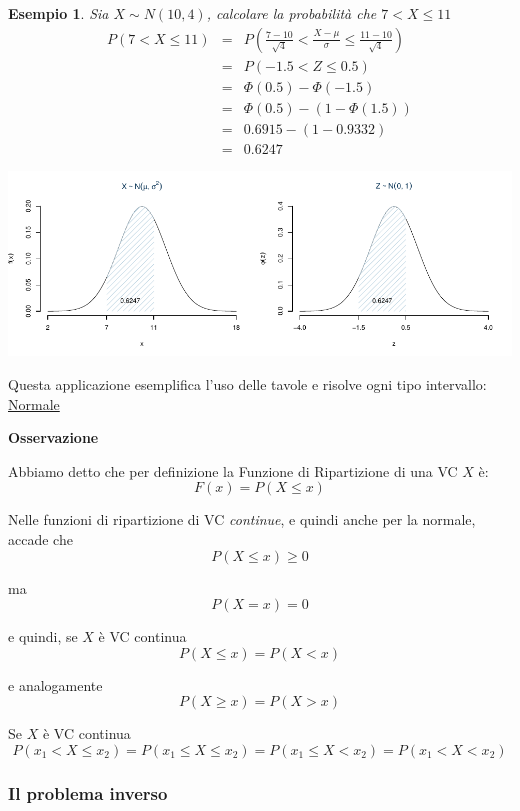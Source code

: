 \documentclass[
  11pt,
]{book}
\theoremstyle{mytheoremstyle}
\theoremstyle{mydefstyle}
\newtheorem{example}{{Esempio}}[section]
\begin{document}
\begin{example}

Sia \(X\sim N(10,4)\), calcolare la probabilità che \(7<X\leq 11\)
\begin{eqnarray*}
P(7<X\leq 11) &=& P\left( \frac {7 - 10}{\sqrt{4}} < \frac {X - \mu}\sigma \leq \frac {11 - 10}{\sqrt{4}}\right)  \\
              &=& P\left( -1.5 < Z \leq 0.5\right) \\
              &=& \Phi(0.5)-\Phi(-1.5)\\
              &=& \Phi(0.5)-(1-\Phi(1.5))\\
              &=& 0.6915-(1-0.9332)\\
              &=& 0.6247
\end{eqnarray*}

\begin{center}\includegraphics{Appunti_di_Statistica_2025_files/figure-latex/07c-Normale-26-1} \end{center}

\end{example}

Questa applicazione esemplifica l'uso delle tavole e risolve ogni tipo intervallo: \href{https://patrizio-frederic.shinyapps.io/normale/}{Normale}

\textbf{Osservazione}

Abbiamo detto che per definizione la Funzione di Ripartizione di una VC \(X\) è:
\[F(x)=P(X\leq x)\]

Nelle funzioni di ripartizione di VC \emph{continue}, e quindi anche per la normale, accade che
\[P(X\leq x)\geq 0\]

ma
\[P(X=x)=0\]

e quindi, se \(X\) è VC continua
\[P(X\leq x)=P(X<x)\]

e analogamente
\[P(X\geq x)=P(X>x)\]

Se \(X\) è VC continua
\[P(x_1<X\leq x_2)=P(x_1\leq X \leq x_2)=P(x_1\leq X < x_2)=P(x_1<X<x_2)\]

\subsubsection{Il problema inverso}\label{il-problema-inverso}
\end{document}
